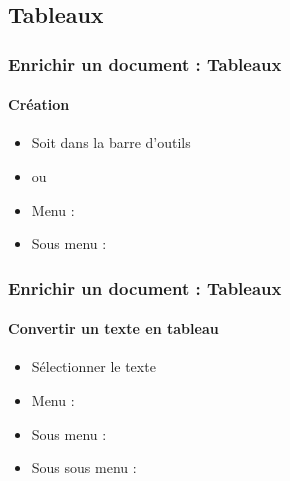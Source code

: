 \documentclass[xcolor=table]{beamer}
\begin{document}
%

\subsection{Tableaux}

\begin{frame}
\frametitle{Enrichir un document : Tableaux}
\framesubtitle{Création}

\begin{minipage}{0.38\textwidth}
	\begin{itemize}
		\item Soit dans la barre d'outils
		\item ou
		\item Menu : 
		\item Sous menu : 
	\end{itemize}
\end{minipage}
\begin{minipage}{0.20\textwidth}	
\end{minipage}
\begin{minipage}{0.40\textwidth}	
\end{minipage}

\end{frame}

\begin{frame}
\frametitle{Enrichir un document : Tableaux}
\framesubtitle{Convertir un texte en tableau}

\begin{minipage}{0.59\textwidth}
	\begin{itemize}
		\item Sélectionner le texte
		\item Menu : 
		\item Sous menu : 
		\item Sous sous menu : 
	\end{itemize}
\end{minipage}
\begin{minipage}{0.40\textwidth}	
\end{minipage}

\end{frame}
\end{document}

